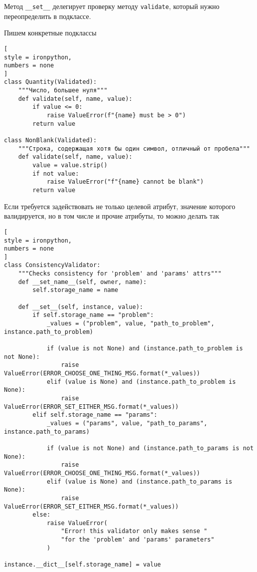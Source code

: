 \documentclass[%
	11pt,
	a4paper,
	utf8,
		]{article}
\begin{document}
Метод \verb|__set__| делегирует проверку методу \verb*|validate|, который нужно переопределить в подклассе.

Пишем конкретные подклассы
\begin{lstlisting}[
style = ironpython,
numbers = none
]
class Quantity(Validated):
    """Число, большее нуля"""
    def validate(self, name, value):
        if value <= 0:
            raise ValueError(f"{name} must be > 0")
        return value
        
class NonBlank(Validated):
    """Строка, содержащая хотя бы один символ, отличный от пробела"""
    def validate(self, name, value):
        value = value.strip()
        if not value:
            raise ValueError("f"{name} cannot be blank")
        return value
\end{lstlisting}

Если требуется задействовать не только целевой атрибут, значение которого валидируется, но в том числе и прочие атрибуты, то можно делать так

\begin{lstlisting}[
style = ironpython,
numbers = none
]
class ConsistencyValidator:
	"""Checks consistency for 'problem' and 'params' attrs"""
	def __set_name__(self, owner, name):
		self.storage_name = name

	def __set__(self, instance, value):
		if self.storage_name == "problem":
			_values = ("problem", value, "path_to_problem", instance.path_to_problem)

			if (value is not None) and (instance.path_to_problem is not None):
				raise ValueError(ERROR_CHOOSE_ONE_THING_MSG.format(*_values))
			elif (value is None) and (instance.path_to_problem is None):
				raise ValueError(ERROR_SET_EITHER_MSG.format(*_values))
		elif self.storage_name == "params":
			_values = ("params", value, "path_to_params", instance.path_to_params)

			if (value is not None) and (instance.path_to_params is not None):
				raise ValueError(ERROR_CHOOSE_ONE_THING_MSG.format(*_values))
			elif (value is None) and (instance.path_to_params is None):
				raise ValueError(ERROR_SET_EITHER_MSG.format(*_values))
		else:
			raise ValueError(
				"Error! this validator only makes sense "
				"for the 'problem' and 'params' parameters"
			)

instance.__dict__[self.storage_name] = value
\end{lstlisting}
\end{document}
